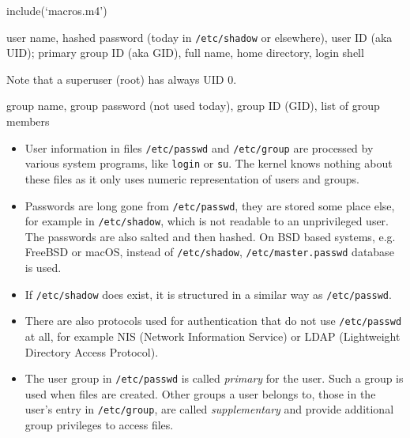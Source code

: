 include(`macros.m4')

\pagebreak
{}

\begin{slide}
\end{slide}

\begin{slide}
\begin{center}
\end{center}
\vspace{2ex}

 user name, 
hashed password (today in \texttt{/etc/shadow} or elsewhere), user ID (aka UID);
primary group ID (aka GID), full name, home directory, login shell

Note that a superuser (root) has always UID 0.

\vspace{2ex}
\begin{center}
\end{center}
\vspace{2ex}

 group name, group password (not
used today), group ID (GID), list of group members
\end{slide}

\begin{itemize}
\item User information in files \texttt{/etc/passwd} and \texttt{/etc/group} are
processed by various system programs, like \texttt{login} or \texttt{su}.
The kernel knows nothing about these files as it only uses numeric
representation of users and groups.
\item Passwords are long gone from \texttt{/etc/passwd}, they are stored some
place else, for example in \texttt{/etc/shadow}, which is not readable to an
unprivileged user.  The passwords are also salted and then hashed. On BSD based
systems, e.g. FreeBSD or macOS, instead of \texttt{/etc/shadow},
\texttt{/etc/master.passwd} database is used.
\item If \texttt{/etc/shadow} does exist, it is structured in a similar way as
\texttt{/etc/passwd}.
\item There are also protocols used for authentication that do not use
\texttt{/etc/passwd} at all, for example NIS (Network Information Service) or
LDAP (Lightweight Directory Access Protocol).
\item The user group in \texttt{/etc/passwd} is called \emph{primary} for the
user.  Such a group is used when files are created.  Other groups a user belongs
to, those in the user's entry in \texttt{/etc/group}, are called
\emph{supplementary} and provide additional group privileges to access files.
\end{itemize}

